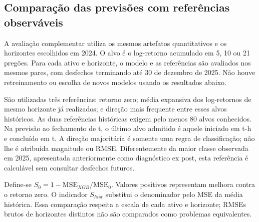\subsection{Comparação das previsões com referências observáveis}

A avaliação complementar utiliza os mesmos artefatos quantitativos e os horizontes escolhidos em 2024. O alvo é o log-retorno acumulado em 5, 10 ou 21 pregões. Para cada ativo e horizonte, o modelo e as referências são avaliados nos mesmos pares, com desfechos terminando até 30 de dezembro de 2025. Não houve retreinamento ou escolha de novos modelos usando os resultados abaixo.

São utilizadas três referências: retorno zero; média expansiva dos log-retornos de mesmo horizonte já realizados; e direção mais frequente entre esses alvos históricos. As duas referências históricas exigem pelo menos 80 alvos conhecidos. Na previsão ao fechamento de t, o último alvo admitido é aquele iniciado em t-h e concluído em t. A direção majoritária é somente uma regra de classificação; não lhe é atribuída magnitude ou RMSE. Diferentemente da maior classe observada em 2025, apresentada anteriormente como diagnóstico ex post, esta referência é calculável sem consultar desfechos futuros.

Define-se $S_0=1-\mathrm{MSE}_{XGB}/\mathrm{MSE}_{0}$. Valores positivos representam melhora contra o retorno zero. O indicador $S_{hist}$ substitui o denominador pelo MSE da média histórica. Essa comparação respeita a escala de cada ativo e horizonte; RMSEs brutos de horizontes distintos não são comparados como problemas equivalentes.

